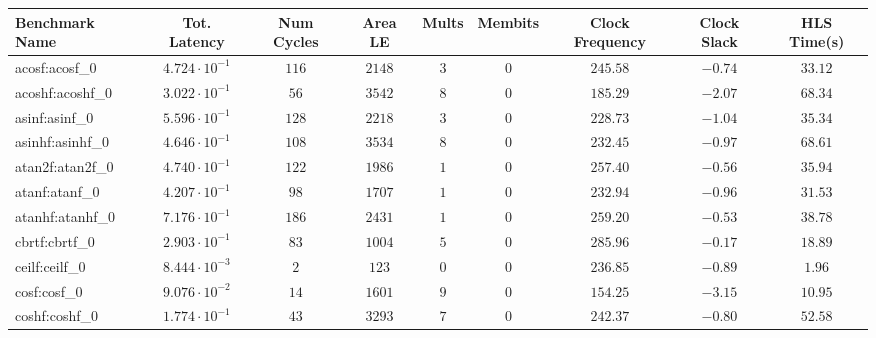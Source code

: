 \begin{tabular}{|l|c|c|c|c|c|c|c|c|}
\hline
Benchmark Name               & Tot. Latency            & Num Cycles & Area LE   & Mults   & Membits & Clock Frequency & Clock Slack & HLS Time(s) \\
\hline
acosf:acosf\_0               & $ 4.724 \cdot 10^{-1} $ & $ 116    $ & $ 2148  $ & $ 3   $ & $ 0   $ & $ 245.58      $ & $ -0.74   $ & $ 33.12   $ \\
acoshf:acoshf\_0             & $ 3.022 \cdot 10^{-1} $ & $ 56     $ & $ 3542  $ & $ 8   $ & $ 0   $ & $ 185.29      $ & $ -2.07   $ & $ 68.34   $ \\
asinf:asinf\_0               & $ 5.596 \cdot 10^{-1} $ & $ 128    $ & $ 2218  $ & $ 3   $ & $ 0   $ & $ 228.73      $ & $ -1.04   $ & $ 35.34   $ \\
asinhf:asinhf\_0             & $ 4.646 \cdot 10^{-1} $ & $ 108    $ & $ 3534  $ & $ 8   $ & $ 0   $ & $ 232.45      $ & $ -0.97   $ & $ 68.61   $ \\
atan2f:atan2f\_0             & $ 4.740 \cdot 10^{-1} $ & $ 122    $ & $ 1986  $ & $ 1   $ & $ 0   $ & $ 257.40      $ & $ -0.56   $ & $ 35.94   $ \\
atanf:atanf\_0               & $ 4.207 \cdot 10^{-1} $ & $ 98     $ & $ 1707  $ & $ 1   $ & $ 0   $ & $ 232.94      $ & $ -0.96   $ & $ 31.53   $ \\
atanhf:atanhf\_0             & $ 7.176 \cdot 10^{-1} $ & $ 186    $ & $ 2431  $ & $ 1   $ & $ 0   $ & $ 259.20      $ & $ -0.53   $ & $ 38.78   $ \\
cbrtf:cbrtf\_0               & $ 2.903 \cdot 10^{-1} $ & $ 83     $ & $ 1004  $ & $ 5   $ & $ 0   $ & $ 285.96      $ & $ -0.17   $ & $ 18.89   $ \\
ceilf:ceilf\_0               & $ 8.444 \cdot 10^{-3} $ & $ 2      $ & $ 123   $ & $ 0   $ & $ 0   $ & $ 236.85      $ & $ -0.89   $ & $ 1.96    $ \\
cosf:cosf\_0                 & $ 9.076 \cdot 10^{-2} $ & $ 14     $ & $ 1601  $ & $ 9   $ & $ 0   $ & $ 154.25      $ & $ -3.15   $ & $ 10.95   $ \\
coshf:coshf\_0               & $ 1.774 \cdot 10^{-1} $ & $ 43     $ & $ 3293  $ & $ 7   $ & $ 0   $ & $ 242.37      $ & $ -0.80   $ & $ 52.58   $ \\

\end{tabular}
